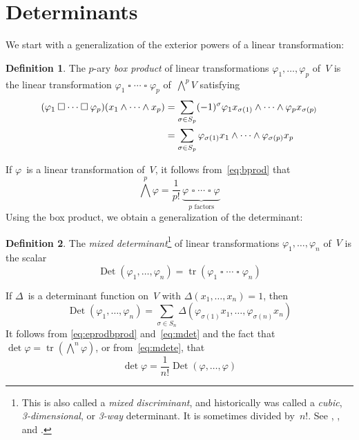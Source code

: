 \documentclass[letterpaper]{article}
\newcommand{\eprod}{\wedge}
\newcommand{\bigeprod}{\bigwedge}
\newcommand{\medeprod}{{\textstyle\bigeprod}}
\newcommand{\bprod}{\mathbin{\square}}
\DeclareMathOperator{\tr}{tr}
\DeclareMathOperator{\Det}{Det}
\newcommand{\sign}[1]{(-1)^{#1}}
\newcommand{\multi}[4]{#2_{#3}#1\cdots#1#2_{#4}}
\newcommand{\eprods}[3]{\multi{\eprod}{#1}{#2}{#3}}
\newcommand{\bprods}[3]{\multi{\bprod}{#1}{#2}{#3}}
\theoremstyle{definition}
\newtheorem{defn}{Definition}
\theoremstyle{plain}
\begin{document}
\section*{Determinants}
We start with a generalization of the exterior powers of a linear transformation:
\begin{defn}
The \(p\)-ary \emph{box product} of linear transformations \(\varphi_1,\ldots,\varphi_p\) of~\(V\) is the linear transformation \(\bprods{\varphi}{1}{p}\) of~\(\medeprod^p V\) satisfying
\begin{align}
(\bprods{\varphi}{1}{p})(\eprods{x}{1}{p})&=\sum_{\sigma\in S_p}\sign{\sigma}\varphi_1x_{\sigma(1)}\eprod\cdots\eprod\varphi_p x_{\sigma(p)}\notag\\
	&=\sum_{\sigma\in S_p}\varphi_{\sigma(1)}x_1\eprod\cdots\eprod\varphi_{\sigma(p)}x_p\label{eq:bprod}
\end{align}
\end{defn}
\noindent If \(\varphi\)~is a linear transformation of~\(V\), it follows from~\eqref{eq:bprod} that
\begin{equation}
\medeprod^p\varphi=\frac{1}{p!}\,\underbrace{\bprods{\varphi}{}{}}_{p\text{ factors}}\label{eq:eprodbprod}
\end{equation}
Using the box product, we obtain a generalization of the determinant:
\begin{defn}
The \emph{mixed determinant}\footnote{This is also called a \emph{mixed discriminant}, and historically was called a \emph{cubic}, \emph{3-dimensional}, or \emph{3-way} determinant. It is sometimes divided by~\(n!\). See \cite{bapat}, \cite{muirmetzler}, and \cite{scott}.} of linear transformations \(\varphi_1,\ldots,\varphi_n\) of~\(V\) is the scalar
\begin{equation}
\Det(\varphi_1,\ldots,\varphi_n)=\tr(\bprods{\varphi}{1}{n})\label{eq:mdet}
\end{equation}
\end{defn}
\noindent If \(\Delta\)~is a determinant function on~\(V\) with \(\Delta(x_1,\ldots,x_n)=1\), then
\begin{equation}
\Det(\varphi_1,\ldots,\varphi_n)=\sum_{\sigma\in S_n}\Delta(\varphi_{\sigma(1)}x_1,\ldots,\varphi_{\sigma(n)}x_n)\label{eq:mdete}
\end{equation}
It follows from \eqref{eq:eprodbprod} and~\eqref{eq:mdet} and the fact that \(\det\varphi=\tr(\medeprod^n\varphi)\), or from~\eqref{eq:mdete}, that
\begin{equation}
\det\varphi=\frac{1}{n!}\Det(\varphi,\ldots,\varphi)\label{eq:detmdet}
\end{equation}
\end{document}
